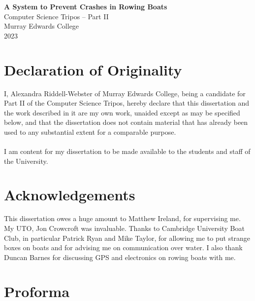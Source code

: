 \documentclass[12pt,a4paper]{report}
\begin{document}
\thispagestyle{empty}


\vspace*{60mm}
\begin{center}
\Huge
\textbf{A System to Prevent Crashes in Rowing Boats} \\[5mm]
Computer Science Tripos -- Part II \\[5mm]
Murray Edwards College \\[5mm]
2023
\end{center}

\pagestyle{plain}
\chapter*{Declaration of Originality}

I, Alexandra Riddell-Webster of Murray Edwards College, being a candidate for Part II of the Computer Science Tripos, hereby declare that this dissertation and the work described in it are my own work, unaided except as may be specified below, and that the dissertation does not contain material that has already been used to any substantial extent for a comparable purpose. \\ \\
I am content for my dissertation to be made available to the students and staff of the University. \\

\bigskip
{}

\chapter*{Acknowledgements}
This dissertation owes a huge amount to Matthew Ireland, for supervising me. My UTO, Jon Crowcroft was invaluable. Thanks to Cambridge University Boat Club, in particular Patrick Ryan and Mike Taylor, for allowing me to put strange boxes on boats and for advising me on communication over water. I also thank Duncan Barnes for discussing GPS and electronics on rowing boats with me.



\chapter*{Proforma}
\end{document}
